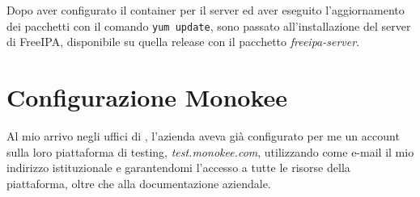 Dopo aver configurato il container per il server ed aver eseguito l'aggiornamento dei pacchetti con il comando \texttt{yum update}, sono passato all'installazione del server di FreeIPA, disponibile su quella release con il pacchetto \emph{freeipa-server}.

\section{Configurazione Monokee}

Al mio arrivo negli uffici di \myAzienda, l'azienda aveva già configurato per me un account sulla loro piattaforma di testing, \emph{test.monokee.com}, utilizzando come e-mail il mio indirizzo istituzionale e garantendomi l'accesso a tutte le risorse della piattaforma, oltre che alla documentazione aziendale.